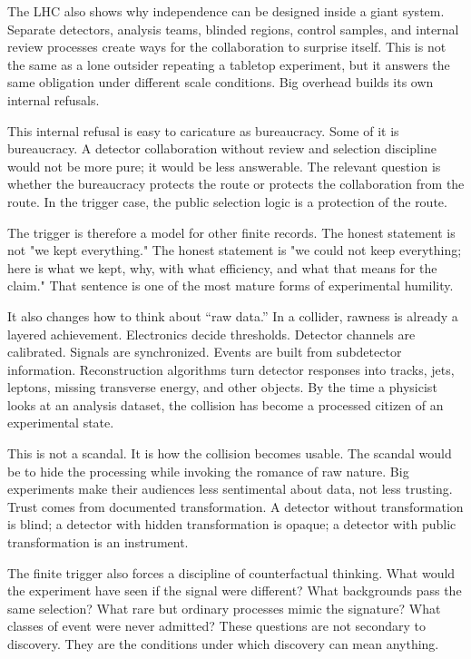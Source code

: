The LHC also shows why independence can be designed inside a giant
system. Separate detectors, analysis teams, blinded regions, control
samples, and internal review processes create ways for the
collaboration to surprise itself. This is not the same as a lone
outsider repeating a tabletop experiment, but it answers the same
obligation under different scale conditions. Big overhead builds its
own internal refusals.

This internal refusal is easy to caricature as bureaucracy. Some of it
is bureaucracy. A detector collaboration without review and selection
discipline would not be more pure; it would be less answerable. The
relevant question is whether the bureaucracy protects the route or
protects the collaboration from the route. In the trigger case, the
public selection logic is a protection of the route.

The trigger is therefore a model for other finite records. The honest statement
is not "we kept everything." The honest statement is "we could not keep
everything; here is what we kept, why, with what efficiency, and what that
means for the claim." That sentence is one of the most mature forms of
experimental humility.

It also changes how to think about ``raw data.'' In a collider, rawness
is already a layered achievement. Electronics decide thresholds. Detector
channels are calibrated. Signals are synchronized. Events are built from
subdetector information. Reconstruction algorithms turn detector responses
into tracks, jets, leptons, missing transverse energy, and other objects. By
the time a physicist looks at an analysis dataset, the collision has become a
processed citizen of an experimental state.

This is not a scandal. It is how the collision becomes usable. The
scandal would be to hide the processing while invoking the romance of
raw nature. Big experiments make their audiences less sentimental about
data, not less trusting. Trust comes from documented transformation. A detector without
transformation is blind; a detector with hidden transformation is opaque; a
detector with public transformation is an instrument.

The finite trigger also forces a discipline of counterfactual thinking. What
would the experiment have seen if the signal were different? What backgrounds
pass the same selection? What rare but ordinary processes mimic the signature?
What classes of event were never admitted? These questions are not secondary
to discovery. They are the conditions under which discovery can mean anything.

